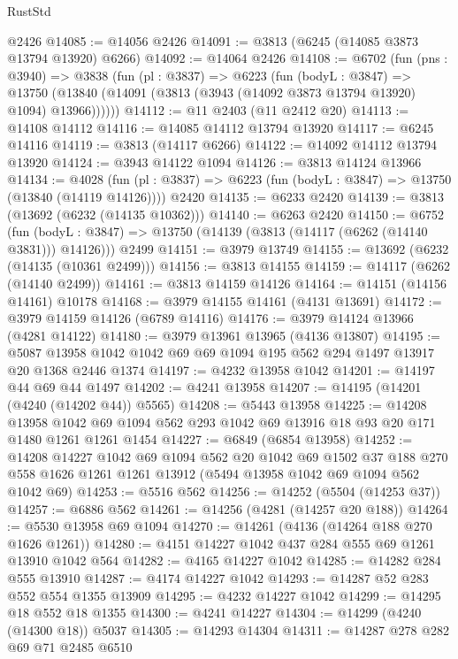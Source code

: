 \begin{lexlean}{RustStd}
\begin{coremodule}
{\begin{coremodule}
{{{{{{{{{{{{{{{{{{{{{{{{{{{{{{{{{{{    @2426
@14085 := @14056 @2426
@14091 := @3813 (@6245 (@14085 @3873 @13794 @13920) @6266)
@14092 := @14064 @2426
@14108 := @6702
    (fun (pns : @3940) =>
    @3838
      (fun (pl : @3837) =>
      @6223
        (fun (bodyL : @3847) =>
        @13750 (@13840 (@14091 (@3813 (@3943 (@14092 @3873 @13794 @13920) @1094) @13966))))))
@14112 := @11 @2403 (@11 @2412 @20)
@14113 := @14108 @14112
@14116 := @14085 @14112 @13794 @13920
@14117 := @6245 @14116
@14119 := @3813 (@14117 @6266)
@14122 := @14092 @14112 @13794 @13920
@14124 := @3943 @14122 @1094
@14126 := @3813 @14124 @13966
@14134 := @4028
    (fun (pl : @3837) => @6223 (fun (bodyL : @3847) => @13750 (@13840 (@14119 @14126))))
    @2420
@14135 := @6233 @2420
@14139 := @3813 (@13692 (@6232 (@14135 @10362)))
@14140 := @6263 @2420
@14150 := @6752
    (fun (bodyL : @3847) => @13750 (@14139 (@3813 (@14117 (@6262 (@14140 @3831))) @14126)))
    @2499
@14151 := @3979 @13749
@14155 := @13692 (@6232 (@14135 (@10361 @2499)))
@14156 := @3813 @14155
@14159 := @14117 (@6262 (@14140 @2499))
@14161 := @3813 @14159 @14126
@14164 := @14151 (@14156 @14161) @10178
@14168 := @3979 @14155 @14161 (@4131 @13691)
@14172 := @3979 @14159 @14126 (@6789 @14116)
@14176 := @3979 @14124 @13966 (@4281 @14122)
@14180 := @3979 @13961 @13965 (@4136 @13807)
@14195 := @5087 @13958 @1042 @1042 @69 @69 @1094 @195 @562 @294 @1497 @13917 @20 @1368 @2446 @1374
@14197 := @4232 @13958 @1042
@14201 := @14197 @44 @69 @44 @1497
@14202 := @4241 @13958
@14207 := @14195 (@14201 (@4240 (@14202 @44)) @5565)
@14208 := @5443 @13958
@14225 := @14208
    @13958
    @1042
    @69
    @1094
    @562
    @293
    @1042
    @69
    @13916
    @18
    @93
    @20
    @171
    @1480
    @1261
    @1261
    @1454
@14227 := @6849 (@6854 @13958)
@14252 := @14208
    @14227
    @1042
    @69
    @1094
    @562
    @20
    @1042
    @69
    @1502
    @37
    @188
    @270
    @558
    @1626
    @1261
    @1261
    @13912
    (@5494 @13958 @1042 @69 @1094 @562 @1042 @69)
@14253 := @5516 @562
@14256 := @14252 (@5504 (@14253 @37))
@14257 := @6886 @562
@14261 := @14256 (@4281 (@14257 @20 @188))
@14264 := @5530 @13958 @69 @1094
@14270 := @14261 (@4136 (@14264 @188 @270 @1626 @1261))
@14280 := @4151 @14227 @1042 @437 @284 @555 @69 @1261 @13910 @1042 @564
@14282 := @4165 @14227 @1042
@14285 := @14282 @284 @555 @13910
@14287 := @4174 @14227 @1042
@14293 := @14287 @52 @283 @552 @554 @1355 @13909
@14295 := @4232 @14227 @1042
@14299 := @14295 @18 @552 @18 @1355
@14300 := @4241 @14227
@14304 := @14299 (@4240 (@14300 @18)) @5037
@14305 := @14293 @14304
@14311 := @14287 @278 @282 @69 @71 @2485 @6510
}}}}}}}}}}}}}}}}}}}}}}}}}}}}}}}}}}}
\end{coremodule}}
\end{coremodule}
\end{lexlean}
